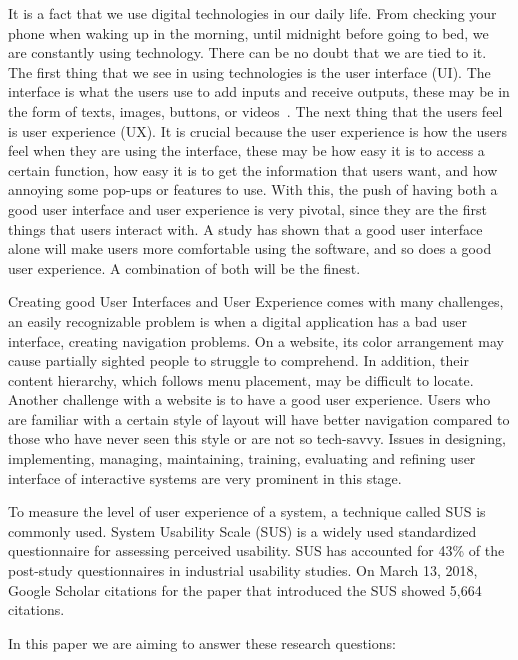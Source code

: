 \documentclass[conference]{IEEEtran}
\begin{document}
It is a fact that we use digital technologies in our daily life. From checking your phone when waking up in the morning, until midnight before going to bed, we are constantly using technology. There can be no doubt that we are tied to it. The first thing that we see in using technologies is the user interface (UI). The interface is what the users use to add inputs and receive outputs, these may be in the form of texts, images, buttons, or videos~\cite{Gramedia}. The next thing that the users feel is user experience (UX). It is crucial because the user experience is how the users feel when they are using the interface\cite{Gramedia}, these may be how easy it is to access a certain function, how easy it is to get the information that users want, and how annoying some pop-ups or features to use. With this, the push of having both a good user interface and user experience is very pivotal, since they are the first things that users interact with. A study has shown that a good user interface alone will make users more comfortable using the software, and so does a good user experience\cite{Watulingas}. A combination of both will be the finest\cite{Watulingas}.

Creating good User Interfaces and User Experience comes with many challenges, an easily recognizable problem is when a digital application has a bad user interface, creating navigation problems. On a website, its color arrangement may cause partially sighted people to struggle to comprehend. In addition, their content hierarchy, which follows menu placement, may be difficult to locate. Another challenge with a website is to have a good user experience. Users who are familiar with a certain style of layout will have better navigation compared to those who have never seen this style or are not so tech-savvy. Issues in designing, implementing, managing, maintaining, training, evaluating and refining user interface of interactive systems are very prominent in this stage\cite{Shneiderman1987}.

To measure the level of user experience of a system, a technique called SUS is commonly used. System Usability Scale (SUS) is a widely used standardized questionnaire for assessing perceived usability\cite{JamesRLewis2018}.  SUS has accounted for 43\% of the post-study questionnaires in industrial usability studies\cite{JamesRLewis2018}. On March 13, 2018, Google Scholar citations for the paper that introduced the SUS showed 5,664 citations\cite{JamesRLewis2018}.

In this paper we are aiming to answer these research questions:
\end{document}
